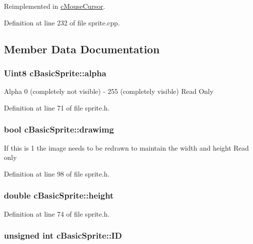 Reimplemented in \hyperlink{classc_mouse_cursor_aa63dd0498aacf4cb6212dff7f3c0cfcb}{c\-Mouse\-Cursor}.



Definition at line 232 of file sprite.\-cpp.



\subsection{Member Data Documentation}
\hypertarget{classc_basic_sprite_ad0eff9f7fd9db3496da83a65d625983c}{
\subsubsection[{alpha}]{\setlength{\rightskip}{0pt plus 5cm}Uint8 c\-Basic\-Sprite\-::alpha}}\label{classc_basic_sprite_ad0eff9f7fd9db3496da83a65d625983c}
Alpha 0 (completely not visible) -\/ 255 (completely visible) Read Only 

Definition at line 71 of file sprite.\-h.

\hypertarget{classc_basic_sprite_a80fbb5b9f21f36769c2a7992994a0042}{
\subsubsection[{drawimg}]{\setlength{\rightskip}{0pt plus 5cm}bool c\-Basic\-Sprite\-::drawimg}}\label{classc_basic_sprite_a80fbb5b9f21f36769c2a7992994a0042}
If this is 1 the image needs to be redrawn to maintain the width and height Read only 

Definition at line 98 of file sprite.\-h.

\hypertarget{classc_basic_sprite_a088106d3526c96d42f8a951f7ccf8b80}{
\subsubsection[{height}]{\setlength{\rightskip}{0pt plus 5cm}double c\-Basic\-Sprite\-::height}}\label{classc_basic_sprite_a088106d3526c96d42f8a951f7ccf8b80}


Definition at line 74 of file sprite.\-h.

\hypertarget{classc_basic_sprite_a3afad558641ff5577c51c1b89cb1a871}{
\subsubsection[{I\-D}]{\setlength{\rightskip}{0pt plus 5cm}unsigned int c\-Basic\-Sprite\-::\-I\-D}}\label{classc_basic_sprite_a3afad558641ff5577c51c1b89cb1a871}


